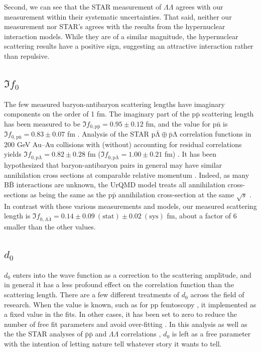 Second, we can see that the STAR measurement of $\Lambda\Lambda$ agrees with our measurement within their systematic uncertainties.
That said, neither our measurement nor STAR's agrees with the results from the hypernuclear interaction models.
While they are of a similar magnitude, the hypernuclear scattering results have a positive sign, suggesting an attractive interaction rather than repulsive.

\subsection{$\Im f_0$}
\label{Imf0Result}

The few measured baryon-antibaryon scattering lengths have imaginary components on the order of 1 fm.
The imaginary part of the $\mathrm{p\bar{p}}$ scattering length has been measured to be $\Im f_{0,\mathrm{p\bar{p}}} = 0.95 \pm 0.12$ fm, and the value for $\mathrm{p\bar{n}}$ is $\Im f_{0,\mathrm{p\bar{n}}} = 0.83 \pm 0.07$ fm \cite{Mutchler:1988av}. 
Analysis of the STAR $\mathrm{p\bar{\Lambda} \oplus \bar{p}\Lambda}$ correlation functions in 200 GeV Au--Au \cite{Adams:2005ws} collisions with (without) accounting for residual correlations yields $\Im f_{0,\mathrm{p\bar{\Lambda}}} = 0.82 \pm 0.28$ fm ($\Im f_{0,\mathrm{p\bar{\Lambda}}} = 1.00 \pm 0.21$ fm) \cite{Kisiel:2014mma}.
It has been hypothesized that baryon-antibaryon pairs in general may have similar annihilation cross sections at comparable relative momentum \cite{Kisiel:2014mma}.
Indeed, as many $\mathrm{B\bar{B}}$ interactions are unknown, the UrQMD model treats all annihilation cross-sections as being the same as the $\mathrm{p\bar{p}}$ annihilation cross-section at the same $\sqrt{s}$ \cite{Bleicher:1999xi}.
In contrast with these various measurements and models, our measured scattering length is $\Im f_{0,\Lambda\bar{\Lambda}} = 0.14 \pm 0.09\ (\mathrm{stat}) \pm 0.02\ (\mathrm{sys})$ fm, about a factor of 6 smaller than the other values.

\subsection{$d_0$}

$d_0$ enters into the wave function as a correction to the scattering amplitude, and in general it has a less profound effect on the correlation function than the scattering length.
There are a few different treatments of $d_0$ across the field of research.
When the value is known, such as for pp femtoscopy \cite{Adam:2015vja}, it implemented as a fixed value in the fits.
In other cases, it has been set to zero to reduce the number of free fit parameters and avoid over-fitting \cite{Kisiel:2014mma, Shapoval:2014yha, Adams:2005ws}.
In this analysis as well as the the STAR analyses of $\mathrm{\bar{p}\bar{p}}$ and $\Lambda\Lambda$ correlations \cite{Adamczyk:2015hza, Adamczyk:2014vca}, $d_0$ is left as a free parameter with the intention of letting nature tell whatever story it wants to tell.

